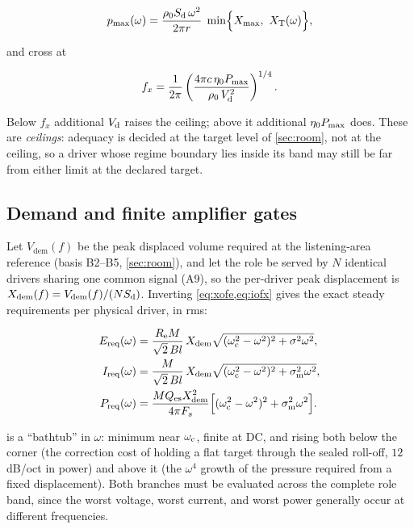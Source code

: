 \begin{equation}
	p_{\max}(\omega) =
		\frac{\rho_0S_{\mathrm{d}}\,\omega^2}{2\pi r}\;
		\min\!\Big\{X_{\mathrm{max}},\ X_{\mathrm{T}}(\omega)\Big\},
	\label{eq:master}
\end{equation}

and cross at

\begin{equation}
	f_x =
		\frac{1}{2\pi}\left(\frac{4\pi c\,\eta_0P_{\mathrm{max}}}{\rho_0\,V_{\mathrm{d}}^{2}}\right)^{1/4} .
	\label{eq:fx}
\end{equation}

Below $f_x$ additional $V_{\mathrm{d}}$ raises the ceiling; above it additional
$\eta_0P_{\mathrm{max}}$ does. These are \emph{ceilings}: adequacy is decided at the
target level of \cref{sec:room}, not at the ceiling, so a driver whose
regime boundary lies inside its band may still be far from either limit at
the declared target.

\subsection{Demand and finite amplifier gates}
\label{sec:freq-gates}

Let $V_{\mathrm{dem}}(f)$ be the peak displaced volume required at the
listening-area reference (basis B2--B5, \cref{sec:room}), and let the role be
served by $N$ identical drivers sharing one common signal (A9), so the
per-driver peak displacement is
$X_{\mathrm{dem}}(f)=V_{\mathrm{dem}}(f)/(NS_{\mathrm{d}})$. Inverting
\cref{eq:xofe,eq:iofx} gives the exact steady requirements per physical
driver, in rms:

\begin{align}
	E_{\mathrm{req}}(\omega)&=
		\frac{R_{\mathrm{e}}M}{\sqrt2\,Bl}\,X_{\mathrm{dem}}
		\sqrt{(\omega_{\mathrm{c}}^2-\omega^2)^2+\sigma^2\omega^2},
		\label{eq:Ereq}\\
	I_{\mathrm{req}}(\omega)&=
		\frac{M}{\sqrt2\,Bl}\,X_{\mathrm{dem}}
		\sqrt{(\omega_{\mathrm{c}}^2-\omega^2)^2+\sigma_{\mathrm{m}}^2\omega^2},
		\label{eq:Ireq}\\
	P_{\mathrm{req}}(\omega)&=
		\frac{MQ_{\mathrm{es}} X_{\mathrm{dem}}^{2}}{4\pi F_s}
		\Big[(\omega_{\mathrm{c}}^2-\omega^2)^2+\sigma_{\mathrm{m}}^2\omega^2\Big] .
		\label{eq:Preq}
\end{align}

 is a ``bathtub'' in $\omega$: minimum near $\omega_{\mathrm{c}}$, finite at
DC, and rising both below the corner (the correction cost of holding a flat
target through the sealed roll-off, $12$\,dB/oct in power) and above it
(the $\omega^4$ growth of the pressure required from a fixed displacement).
Both branches must be evaluated across the complete role band, since the
worst voltage, worst current, and worst power generally occur at different
frequencies.

